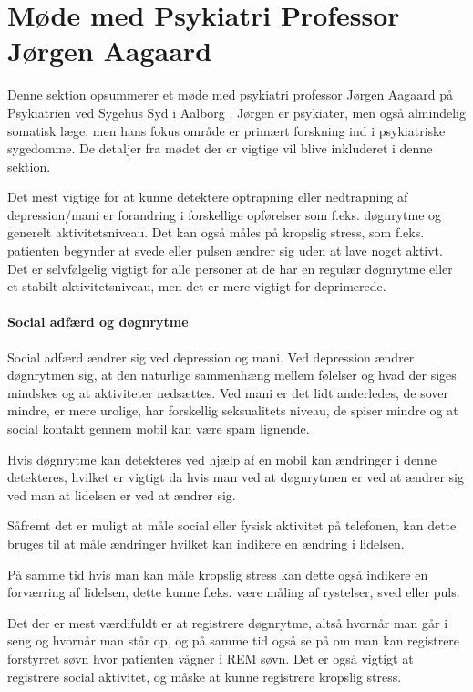 \section{Møde med Psykiatri Professor Jørgen Aagaard}\label{sec:moede-med-joergen}
Denne sektion opsummerer et møde med psykiatri professor Jørgen Aagaard på Psykiatrien ved Sygehus Syd i Aalborg \citep{misc:jorgen-aagaard}. 
Jørgen er psykiater, men også almindelig somatisk læge, men hans fokus område er primært forskning ind i psykiatriske sygedomme.
De detaljer fra mødet der er vigtige vil blive inkluderet i denne sektion.


Det mest vigtige for at kunne detektere optrapning eller nedtrapning af depression/mani er forandring i forskellige opførelser som f.eks. døgnrytme og generelt aktivitetsniveau. Det kan også måles på kropslig stress, som f.eks. patienten begynder at svede eller pulsen ændrer sig uden at lave noget aktivt. 
Det er selvfølgelig vigtigt for alle personer at de har en regulær døgnrytme eller et stabilt aktivitetsniveau, men det er mere vigtigt for deprimerede.

\paragraph{Social adfærd og døgnrytme}
Social adfærd ændrer sig ved depression og mani.
Ved depression ændrer døgnrytmen sig, at den naturlige sammenhæng mellem følelser og hvad der siges mindskes og at aktiviteter nedsættes.
Ved mani er det lidt anderledes, de sover mindre, er mere urolige, har forskellig seksualitets niveau, de spiser mindre og at social kontakt gennem mobil kan være spam lignende. 

Hvis døgnrytme kan detekteres ved hjælp af en mobil kan ændringer i denne detekteres, hvilket er vigtigt da hvis man ved at døgnrytmen er ved at ændrer sig ved man at lidelsen er ved at ændrer sig.

Såfremt det er muligt at måle social eller fysisk aktivitet på telefonen, kan dette bruges til at måle ændringer hvilket kan indikere en ændring i lidelsen.

På samme tid hvis man kan måle kropslig stress kan dette også indikere en forværring af lidelsen, dette kunne f.eks. være måling af rystelser, sved eller puls. 

Det der er mest værdifuldt er at registrere døgnrytme, altså hvornår man går i seng og hvornår man står op, og på samme tid også se på om man kan registrere forstyrret søvn hvor patienten vågner i REM søvn. 
Det er også vigtigt at registrere social aktivitet, og måske at kunne registrere kropslig stress.

